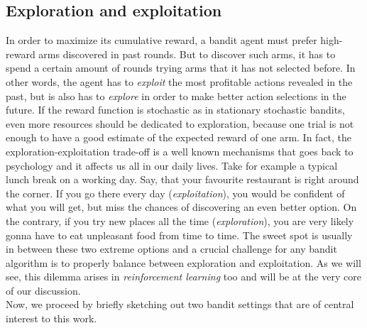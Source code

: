 \subsection{Exploration and exploitation} \label{eedilemma}
In order to maximize its cumulative reward, a bandit agent must prefer high-reward arms discovered in past rounds. But to discover such arms, it has to spend a certain amount of rounds trying arms that it has not selected before. In other words, the agent has to \emph{exploit} the most profitable actions revealed in the past, but is also has to \emph{explore} in order to make better action selections in the future. If the reward function is stochastic as in stationary stochastic bandits, even more resources should be dedicated to exploration, because one trial is not enough to have a good estimate of the expected reward of one arm.  In fact, the exploration-exploitation trade-off is a well known mechanisms that goes back to psychology and it affects us all in our daily lives. Take for example a typical lunch break on a working day. Say, that your favourite restaurant is right around the corner. If you go there every day (\emph{exploitation}), you would be confident of what you will get, but miss the chances of discovering an even better option. On the contrary, if you try new places all the time (\emph{exploration}), you are very likely gonna have to eat unpleasant food from time to time. The sweet spot is usually in between these two extreme options and a crucial challenge for any bandit algorithm is to properly balance between exploration and exploitation. As we will see, this dilemma arises in \emph{reinforcement learning} too and will be at the very core of our discussion.
\\ Now, we proceed by briefly sketching out two bandit settings that are of central interest to this work.

